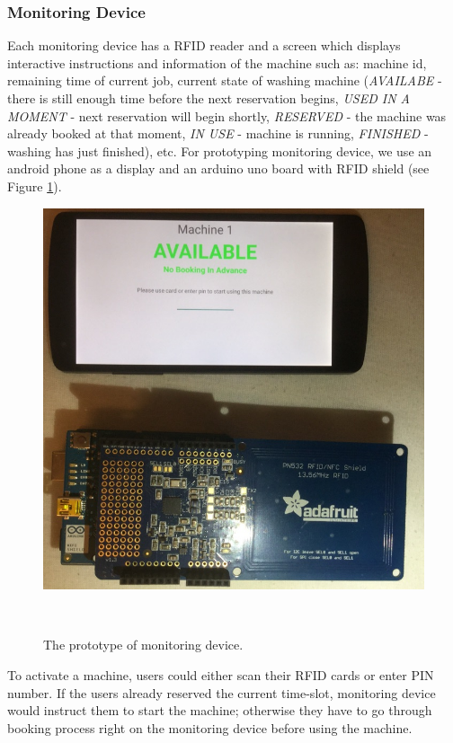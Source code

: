 \subsubsection{Monitoring Device}
Each monitoring device has a RFID reader and a screen which displays interactive instructions and information of the machine such as: machine id, remaining time of current job, current state of washing machine (\emph{AVAILABE} - there is still enough time before the next reservation begins, \emph{USED IN A MOMENT} - next reservation will begin shortly, \emph{RESERVED} - the machine was already booked at that moment, \emph{IN USE} - machine is running, \emph{FINISHED} - washing has just finished), etc.
 For prototyping monitoring device, we use an android phone as a display and an arduino uno board with RFID shield (see Figure \ref{fig:figure2}).
\begin{figure}[h]
\centering
  \includegraphics[width=0.7\columnwidth]{figures/Monitoring}
  \caption{The prototype of monitoring device.}~\label{fig:figure2}
\end{figure}
To activate a machine, users could either scan their RFID cards or enter PIN number. If the users already reserved the current time-slot, monitoring device would instruct them to start the machine; otherwise they have to go through booking process right on the monitoring device before using the machine.

